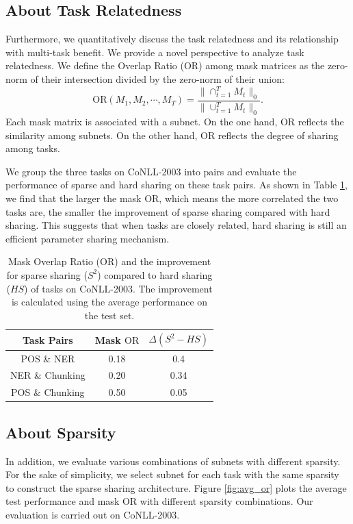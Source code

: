 \documentclass[letterpaper]{article} %
\begin{document}
\subsection{About Task Relatedness}

Furthermore, we quantitatively discuss the task relatedness and its relationship with multi-task benefit. We provide a novel perspective to analyze task relatedness.
We define the Overlap Ratio (OR) among mask matrices as the zero-norm of their intersection divided by the zero-norm of their union:
\begin{equation}\label{eq:or}
    \mathrm{OR}(M_1, M_2, \cdots, M_T) = \frac{\| \cap_{t=1}^TM_t\|_0}{\|\cup_{t=1}^TM_t\|_0}.
\end{equation}
Each mask matrix is associated with a subnet. On the one hand, OR reflects the similarity among subnets. On the other hand, OR reflects the degree of sharing among tasks.

We group the three tasks on CoNLL-2003 into pairs and evaluate the performance of sparse and hard sharing on these task pairs. As shown in Table \ref{tb:task_or}, we find that the larger the mask OR, which means the more correlated the two tasks are, the smaller the improvement of sparse sharing compared with hard sharing. This suggests that when tasks are closely related, hard sharing is still an efficient parameter sharing mechanism.

\begin{table}[!htbp]
\centering
\begin{tabular}{ccc}
\toprule
Task Pairs & Mask $\mathrm{OR}$ & $\Delta(S^2-HS)$ \\ \midrule
POS \& NER & 0.18 & 0.4 \\
NER \& Chunking & 0.20 & 0.34 \\
POS \& Chunking & 0.50 & 0.05 \\ \bottomrule
\end{tabular}
\caption{Mask Overlap Ratio ($\mathrm{OR}$) and the improvement for sparse sharing ($S^2$) compared to hard sharing ($HS$) of tasks on CoNLL-2003. The improvement is calculated using the average performance on the test set.}
\label{tb:task_or}
\end{table}

\subsection{About Sparsity}
In addition, we evaluate various combinations of subnets with different sparsity. For the sake of simplicity, we select subnet for each task with the same sparsity to construct the sparse sharing architecture. Figure \ref{fig:avg_or} plots the average test performance and mask OR with different sparsity combinations. Our evaluation is carried out on CoNLL-2003.
\end{document}
